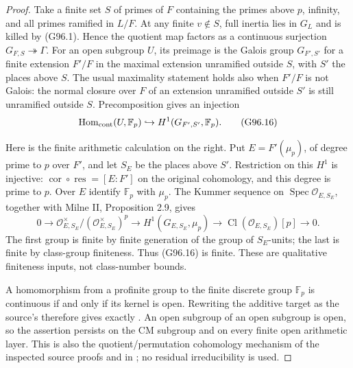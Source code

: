\begin{proof}
Take a finite set \(S\) of primes of \(F\) containing the primes
above \(p\), infinity, and all primes ramified in \(L/F\).
At any finite \(v\notin S\), full inertia lies in \(G_L\) and is
killed by (G96.1).  Hence the quotient map factors as a continuous
surjection \(G_{F,S}\twoheadrightarrow\Gamma\).
For an open subgroup \(U\), its preimage is the Galois group
\(G_{F',S'}\) for a finite extension \(F'/F\) in the maximal
extension unramified outside \(S\), with \(S'\) the places above
\(S\).  The usual maximality statement holds also when \(F'/F\)
is not Galois: the normal closure over \(F\) of an extension
unramified outside \(S'\) is still unramified outside \(S\).
Precomposition gives an injection
\[
 \operatorname{Hom}_{\rm cont}(U,\mathbb F_p)
       \hookrightarrow H^1(G_{F',S'},\mathbb F_p).
 \tag{G96.16}
\]

Here is the finite arithmetic calculation on the right.  Put
\(E=F'(\mu_p)\), of degree prime to \(p\) over \(F'\), and
let \(S_E\) be the places above \(S'\).  Restriction on this
\(H^1\) is injective: \(\operatorname{cor}\circ\operatorname{res}
=[E:F']\) on the original cohomology, and this degree is
prime to \(p\).  Over \(E\) identify
\(\mathbb F_p\) with \(\mu_p\).  The Kummer sequence on
\(\operatorname{Spec}\mathcal O_{E,S_E}\), together with
Milne II, Proposition 2.9, gives
\[
 0\longrightarrow \mathcal O_{E,S_E}^{\times}/
                       (\mathcal O_{E,S_E}^{\times})^p
 \longrightarrow H^1(G_{E,S_E},\mu_p)
 \longrightarrow \operatorname{Cl}(\mathcal O_{E,S_E})[p]
 \longrightarrow0.
 \tag{G96.17}
\]
The first group is finite by finite generation of the group
of \(S_E\)-units; the last is finite by class-group finiteness.
Thus (G96.16) is finite.  These are qualitative finiteness
inputs, not class-number bounds.

A homomorphism from a profinite group to the finite discrete
group \(\mathbb F_p\) is continuous if and only if its kernel
is open.  Rewriting the additive target as the source's
 therefore gives exactly
.  An open subgroup of an open subgroup is open,
so the assertion persists on the CM subgroup and on every finite
open arithmetic layer.  This is also the quotient/permutation
cohomology mechanism of the inspected source proofs
 and 
in ; no residual irreducibility is used.
\end{proof}

